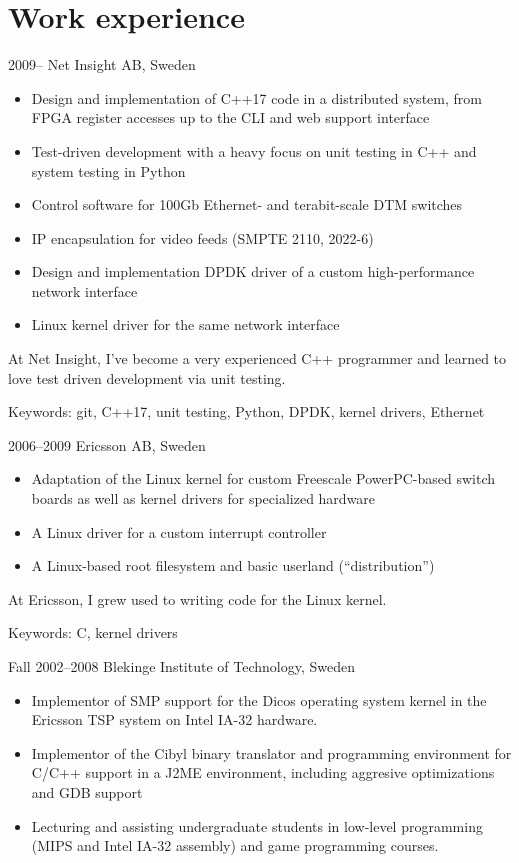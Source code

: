 \documentclass[a4paper]{article}
\begin{document}
\section{Work experience}

\begin{CV}
\item[2009--] Net Insight AB, Sweden
  \begin{itemize}
    \item Design and implementation of C++17 code in a distributed system, from FPGA 
      register accesses up to the CLI and web support interface
    \item Test-driven development with a heavy focus on unit testing in C++ and system testing
          in Python
    \item Control software for 100Gb Ethernet- and terabit-scale DTM switches
    \item IP encapsulation for video feeds (SMPTE 2110, 2022-6)
    \item Design and implementation DPDK driver of a custom high-performance network interface
    \item Linux kernel driver for the same network interface
  \end{itemize}
At Net Insight, I've become a very experienced C++ programmer and learned to love
test driven development via unit testing.

Keywords: git, C++17, unit testing, Python, DPDK, kernel drivers, Ethernet

\item[2006--2009] Ericsson AB, Sweden

  \begin{itemize}
  \item Adaptation of the Linux kernel for custom Freescale PowerPC-based
    switch boards as well as kernel drivers for specialized hardware
  \item A Linux driver for a custom interrupt controller
  \item A Linux-based root filesystem and basic userland (``distribution'')
  \end{itemize}

At Ericsson, I grew used to writing code for the Linux kernel.

Keywords: C, kernel drivers

\item[Fall 2002--2008] Blekinge Institute of Technology, Sweden

  \begin{itemize}
  \item Implementor of SMP support for the Dicos operating system
    kernel in the Ericsson TSP system on Intel IA-32 hardware.
  \item Implementor of the Cibyl binary translator and programming environment
    for C/C++ support in a J2ME environment, including aggresive optimizations
    and GDB support
  \item Lecturing and assisting undergraduate students in low-level
    programming (MIPS and Intel IA-32 assembly) and game programming courses.
  \end{itemize}


\end{CV}
\end{document}
